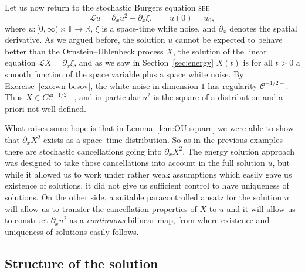 \documentclass[a4paper,11pt]{article}
\newcommand{\tmname}[1]{\textsc{#1}}
\newcommand{\tmtextit}[1]{{\itshape{#1}}}
\newcommand{\LL}{\mathscr{L}}
\newcommand{\CC}{\mathscr{C}}
\begin{document}
Let us now return to the stochastic Burgers equation {\tmname{sbe}}
\begin{equation}
  \LL u = \partial_x u^2 + \partial_x \xi, \hspace{2em} u (0) = u_0,
  \label{eq:sbe-theta}
\end{equation}
where $u : [0, \infty) \times \mathbb{T} \rightarrow \mathbb{R}$, $\xi$ is a
space-time white noise, and $\partial_x$ denotes the spatial derivative. As we
argued before, the solution $u$ cannot be expected to behave better than the
Ornstein--Uhlenbeck process $X$, the solution of the linear equation $\LL X =
\partial_x \xi$, and as we saw in Section~\ref{sec:energy} $X (t)$ is for all
$t > 0$ a smooth function of the space variable plus a space white noise. By
Exercise~\ref{exo:wn besov}, the white noise in dimension $1$ has regularity
$\CC^{- 1 / 2 -}$. Thus $X \in C \CC^{- 1 / 2 -}$, and in particular $u^2$ is
the square of a distribution and a priori not well defined.

What raises some hope is that in Lemma~\ref{lem:OU square} we were able to
show that $\partial_x X^2$ exists as a space--time distribution. So as in the
previous examples there are stochastic cancellations going into $\partial_x
X^2$. The energy solution approach was designed to take those cancellations
into account in the full solution $u$, but while it allowed us to work under
rather weak assumptions which easily gave us existence of solutions, it did
not give us sufficient control to have uniqueness of solutions. On the other
side, a suitable paracontrolled ansatz for the solution $u$ will allow us to
transfer the cancellation properties of $X$ to $u$ and it will allow us to
construct $\partial_x u^2$ as a \tmtextit{continuous} bilinear map, from where
existence and uniqueness of solutions easily follows.

\subsection{Structure of the solution}
\end{document}
